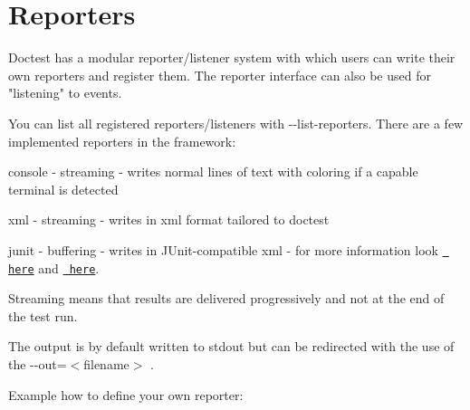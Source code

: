 \chapter{Reporters}
\hypertarget{md_doctest_2doc_2markdown_2reporters}{}\label{md_doctest_2doc_2markdown_2reporters}
\label{md_doctest_2doc_2markdown_2reporters_autotoc_md161}%
%


Doctest has a modular reporter/listener system with which users can write their own reporters and register them. The reporter interface can also be used for "{}listening"{} to events.

You can list all registered reporters/listeners with {\ttfamily -\/-\/list-\/reporters}. There are a few implemented reporters in the framework\+:
\begin{DoxyItemize}
\item {\ttfamily console} -\/ streaming -\/ writes normal lines of text with coloring if a capable terminal is detected
\item {\ttfamily xml} -\/ streaming -\/ writes in xml format tailored to doctest
\item {\ttfamily junit} -\/ buffering -\/ writes in JUnit-\/compatible xml -\/ for more information look \href{https://github.com/doctest/doctest/issues/318}{\texttt{ here}} and \href{https://github.com/doctest/doctest/issues/376}{\texttt{ here}}.
\end{DoxyItemize}

Streaming means that results are delivered progressively and not at the end of the test run.

The output is by default written to {\ttfamily stdout} but can be redirected with the use of the {\ttfamily -\/-\/out=\texorpdfstring{$<$}{<}filename\texorpdfstring{$>$}{>}} .

Example how to define your own reporter\+:


